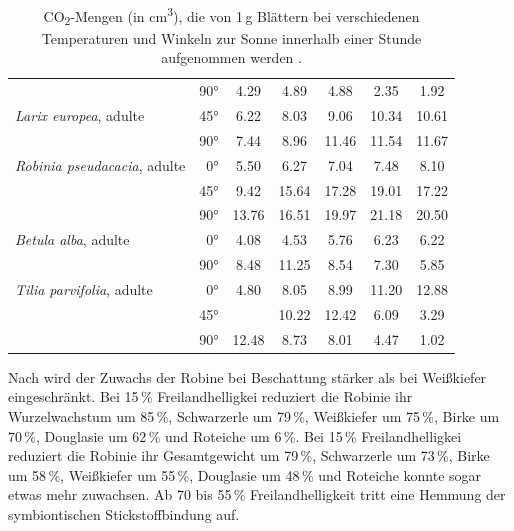 \documentclass[twocolumn]{scrartcl}
\begin{document}
\begin{table}[htbp]
{\begin{tabular}{lc*{5}{S[table-format=2.2]}}
                                             & 90°        & 4.29 & 4.89 & 4.88 & 2.35 & 1.92 \\[.3em]
\textit{Larix europea}, adulte               & 45°        & 6.22 & 8.03 & 9.06 & 10.34 & 10.61 \\
                                             & 90°        & 7.44 & 8.96 & 11.46 & 11.54 & 11.67 \\[.3em]
\textit{Robinia pseudacacia}, adulte         & ~0°        & 5.50 & 6.27 & 7.04 & 7.48 & 8.10 \\
                                             & 45°        & 9.42 & 15.64 & 17.28 & 19.01 & 17.22 \\
                                             & 90°        & 13.76 & 16.51 & 19.97 & 21.18 & 20.50 \\[.3em]
\textit{Betula alba}, adulte                 & ~0°        & 4.08 & 4.53 & 5.76 & 6.23 & 6.22 \\
                                             & 90°        & 8.48 & 11.25 & 8.54 & 7.30 & 5.85 \\[.3em]
\textit{Tilia parvifolia}, adulte            & ~0°        & 4.80 & 8.05 & 8.99 & 11.20 & 12.88 \\
                                             & 45°        & {}   & 10.22 & 12.42 & 6.09 & 3.29 \\
                                             & 90°        & 12.48 & 8.73 & 8.01 & 4.47 & 1.02 \\
\bottomrule
\end{tabular}}
    \caption{CO\textsubscript{2}-Mengen (in cm\textsuperscript{3}), die von 1\,g Blättern bei verschiedenen Temperaturen und Winkeln zur Sonne innerhalb einer Stunde aufgenommen werden \citep{lubimenko1906npp}.}
    \label{tab:nppTempWinkel}
\end{table}

Nach \citet{lyr1963beschattung,lyr1964beschattung} wird der Zuwachs der Robine bei Beschattung stärker als bei Weißkiefer eingeschränkt. Bei 15\,\% Freilandhelligkei reduziert die Robinie ihr Wurzelwachstum um 85\,\%, Schwarzerle um 79\,\%, Weißkiefer um 75\,\%, Birke um 70\,\%, Douglasie um 62\,\% und Roteiche um 6\,\%.  Bei 15\,\% Freilandhelligkei reduziert die Robinie ihr Gesamtgewicht um 79\,\%, Schwarzerle um 73\,\%, Birke um 58\,\%, Weißkiefer um 55\,\%, Douglasie um 48\,\% und Roteiche konnte sogar etwas mehr zuwachsen. Ab 70 bis 55\,\% Freilandhelligkeit tritt eine Hemmung der symbiontischen Stickstoffbindung auf.
\end{document}

